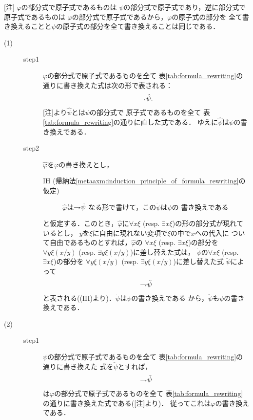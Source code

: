 	\begin{metaprf}\mbox{}
		[注] $\varphi$の部分式で原子式であるものは
		$\psi$の部分式で原子式であり，逆に部分式で原子式であるものは
		$\varphi$の部分式で原子式であるから，$\varphi$の原子式の部分を
		全て書き換えることと$\psi$の原子式の部分を全て書き換えることは同じである．
		\begin{description}
			\item[(1)] 
				\begin{description}
					\item[step1]
						$\varphi$の部分式で原子式であるものを全て
						表\ref{tab:formula_rewriting}の通りに書き換えた式は次の形で表される：
						\begin{align}
							\rightharpoondown\hspace{-0.25em} \hat{\psi}.
						\end{align}
						[注]より$\hat{\psi}$とは$\psi$の部分式で
						原子式であるものを全て
						表\ref{tab:formula_rewriting}の通りに直した式である．
						ゆえに$\hat{\psi}$は$\psi$の書き換えである．
						
					\item[step2]
						$\widehat{\varphi}$を$\varphi$の書き換えとし，
						\begin{description}
							\item[IH (帰納法\ref{metaaxm:induction_principle_of_formula_rewriting}の仮定)]
								$\widehat{\varphi}$は$\rightharpoondown\hspace{-0.25em} \dot{\psi}$
								なる形で書けて，この$\dot{\psi}$は$\psi$の
								書き換えである
						\end{description}
						と仮定する．このとき，$\widehat{\varphi}$に$\forall x \xi$ 
						(resp. $\exists x \xi$)の形の部分式が現れているとし，
						$y$を$\xi$に自由に現れない変項で$\xi$の中で$x$への代入に
						ついて自由であるものとすれば，$\widehat{\varphi}$の
						$\forall x \xi$ (resp. $\exists x \xi$)の部分を
						$\forall y \xi(x/y)$
						(resp. $\exists y \xi(x/y)$)に差し替えた式は，
						$\dot{\psi}$の$\forall x \xi$
						(resp. $\exists x \xi$)の部分を
						$\forall y \xi(x/y)$
						(resp. $\exists y \xi(x/y)$)に差し替えた式
						$\ddot{\psi}$によって
						\begin{align}
							\rightharpoondown\hspace{-0.25em} \ddot{\psi}
						\end{align}
						と表される((IH)より)．$\dot{\psi}$は$\psi$の書き換えである
						から，$\ddot{\psi}$も$\psi$の書き換えである．
				\end{description}
				
			\item[(2)]		
				\begin{description}
					\item[step1]
						$\psi$の部分式で原子式であるものを全て
						表\ref{tab:formula_rewriting}の通りに書き換えた
						式を$\check{\psi}$とすれば，
						\begin{align}
							\rightharpoondown\hspace{-0.25em} \check{\psi}
						\end{align}
						は$\varphi$の部分式で原子式であるものを全て
						表\ref{tab:formula_rewriting}の通りに書き換えた式である([注]より)．
						従ってこれは$\varphi$の書き換えである．
								

\end{description}
\end{description}
\end{metaprf}
